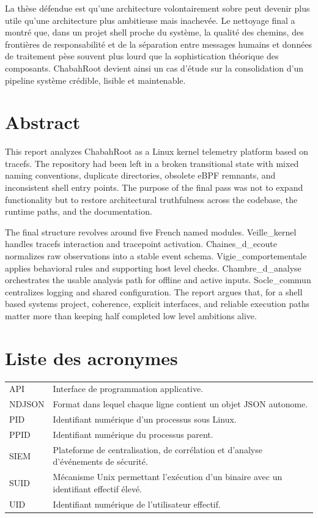 \documentclass[12pt,a4paper]{report}
\begin{document}
La thèse défendue est qu’une architecture volontairement sobre peut devenir plus utile qu’une architecture plus ambitieuse mais inachevée. Le nettoyage final a montré que, dans un projet shell proche du système, la qualité des chemins, des frontières de responsabilité et de la séparation entre messages humains et données de traitement pèse souvent plus lourd que la sophistication théorique des composants. ChabahRoot devient ainsi un cas d’étude sur la consolidation d’un pipeline système crédible, lisible et maintenable.

\chapter*{Abstract}
This report analyzes ChabahRoot as a Linux kernel telemetry platform based on tracefs. The repository had been left in a broken transitional state with mixed naming conventions, duplicate directories, obsolete eBPF remnants, and inconsistent shell entry points. The purpose of the final pass was not to expand functionality but to restore architectural truthfulness across the codebase, the runtime paths, and the documentation.

The final structure revolves around five French named modules. Veille\_kernel handles tracefs interaction and tracepoint activation. Chaines\_d\_ecoute normalizes raw observations into a stable event schema. Vigie\_comportementale applies behavioral rules and supporting host level checks. Chambre\_d\_analyse orchestrates the usable analysis path for offline and active inputs. Socle\_commun centralizes logging and shared configuration. The report argues that, for a shell based systems project, coherence, explicit interfaces, and reliable execution paths matter more than keeping half completed low level ambitions alive.

\tableofcontents
\listoffigures
\listoftables

\chapter*{Liste des acronymes}
\begin{longtable}{>{\raggedright\arraybackslash}p{3cm} >{\raggedright\arraybackslash}p{10cm}}
API & Interface de programmation applicative. \\
NDJSON & Format dans lequel chaque ligne contient un objet JSON autonome. \\
PID & Identifiant numérique d’un processus sous Linux. \\
PPID & Identifiant numérique du processus parent. \\
SIEM & Plateforme de centralisation, de corrélation et d’analyse d’événements de sécurité. \\
SUID & Mécanisme Unix permettant l’exécution d’un binaire avec un identifiant effectif élevé. \\
UID & Identifiant numérique de l’utilisateur effectif. \\
\end{longtable}
\end{document}
